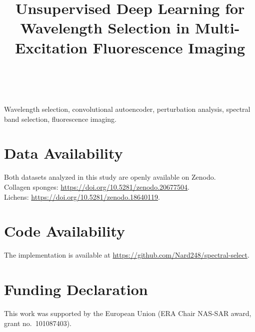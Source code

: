 \documentclass[journal]{IEEEtran}
\begin{document}
\title{Unsupervised Deep Learning for Wavelength Selection in Multi-Excitation Fluorescence Imaging}

\author{
\\
}

\maketitle



\begin{IEEEkeywords}
Wavelength selection, convolutional autoencoder, perturbation analysis, spectral band selection, fluorescence imaging.
\end{IEEEkeywords}









\section*{Data Availability}
Both datasets analyzed in this study are openly available on Zenodo. 
\\ 
Collagen sponges: \url{https://doi.org/10.5281/zenodo.20677504}. 
\\
Lichens: \url{https://doi.org/10.5281/zenodo.18640119}.

\section*{Code Availability}
The implementation is available at \url{https://github.com/Nard248/spectral-select}.

\section*{Funding Declaration}
This work was supported by the European Union (ERA Chair NAS-SAR award, grant no.\ 101087403).
\end{document}
